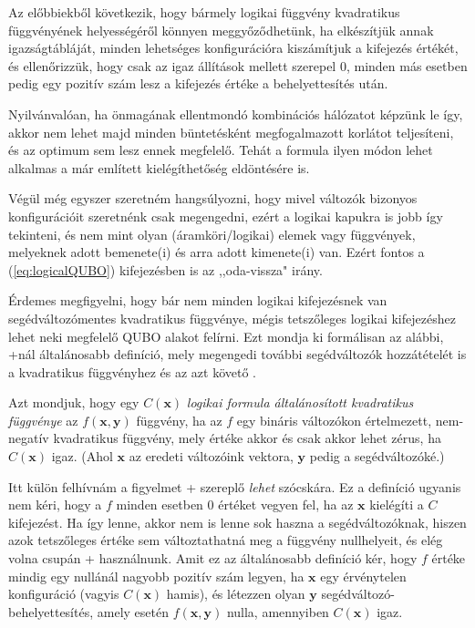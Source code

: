 Az előbbiekből következik, hogy bármely logikai függvény kvadratikus függvényének helyességéről könnyen meggyőződhetünk, ha elkészítjük annak igazságtábláját, minden lehetséges konfigurációra kiszámítjuk a kifejezés értékét, és ellenőrizzük, hogy csak az igaz állítások mellett szerepel 0, minden más esetben pedig egy pozitív szám lesz a kifejezés értéke a behelyettesítés után.

Nyilvánvalóan, ha önmagának ellentmondó kombinációs hálózatot képzünk le így, akkor nem lehet majd minden büntetésként megfogalmazott korlátot teljesíteni, és az optimum sem lesz ennek megfelelő. Tehát a formula ilyen módon lehet alkalmas a már említett kielégíthetőség eldöntésére is.

Végül még egyszer szeretném hangsúlyozni, hogy mivel változók bizonyos konfigurációit szeretnénk csak megengedni, ezért a logikai kapukra is jobb így tekinteni, és nem mint olyan (áramköri/logikai) elemek vagy függvények, melyeknek adott bemenete(i) és arra adott kimenete(i) van. Ezért fontos a (\ref{eq:logicalQUBO}) kifejezésben is az ,,oda-vissza" irány.

Érdemes megfigyelni, hogy bár nem minden logikai kifejezésnek van segédváltozómentes kvadratikus függvénye, mégis tetszőleges logikai kifejezéshez lehet neki megfelelő QUBO alakot felírni. Ezt mondja ki formálisan az alábbi, \az+nál általánosabb definíció, mely megengedi további segédváltozók hozzátételét is a kvadratikus függvényhez és az azt követő .

\begin{definition}\label{def:kvadFuncgen}
	Azt mondjuk, hogy egy $C(\mathbf{x})$ \textit{logikai formula általánosított kvadratikus függvénye} az $f(\mathbf{x},\mathbf{y})$ függvény, ha az $f$ egy bináris változókon értelmezett, nem-negatív kvadratikus függvény, mely értéke akkor és csak akkor lehet zérus, ha $C(\mathbf{x})$ igaz. (Ahol $\mathbf{x}$ az eredeti változóink vektora, $\mathbf{y}$ pedig a segédváltozóké.)
\end{definition}

Itt külön felhívnám a figyelmet \az+ szereplő \textit{lehet} szócskára.
Ez a definíció ugyanis nem kéri, hogy a $f$ minden esetben 0 értéket vegyen fel, ha az $\mathbf{x}$ kielégíti a $C$ kifejezést. Ha így lenne, akkor nem is lenne sok haszna a segédváltozóknak, hiszen azok tetszőleges értéke sem változtathatná meg a függvény nullhelyeit, és elég volna csupán \az+ használnunk. Amit ez az általánosabb definíció kér, hogy $f$ értéke mindig egy nullánál nagyobb pozitív szám legyen, ha $\mathbf{x}$ egy érvénytelen konfiguráció (vagyis $C(\mathbf{x})$ hamis), és létezzen olyan $\mathbf{y}$ segédváltozó-behelyettesítés, amely esetén $f(\mathbf{x},\mathbf{y})$ nulla, amennyiben $C(\mathbf{x})$ igaz.



